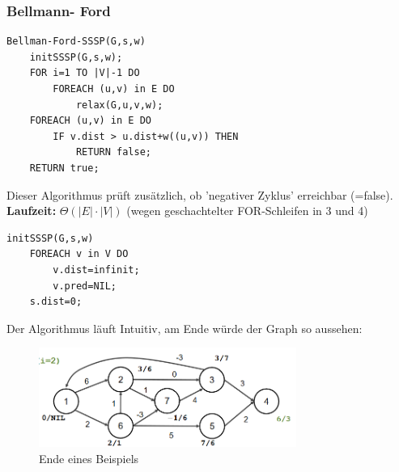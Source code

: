 \documentclass{article}
\begin{document}
            \subsubsection{Bellmann- Ford}
                \begin{lstlisting}[style=pseudocode]
Bellman-Ford-SSSP(G,s,w)
    initSSSP(G,s,w);
    FOR i=1 TO |V|-1 DO
        FOREACH (u,v) in E DO
            relax(G,u,v,w);
    FOREACH (u,v) in E DO
        IF v.dist > u.dist+w((u,v)) THEN
            RETURN false;
    RETURN true;
                \end{lstlisting}
                Dieser Algorithmus prüft zusätzlich, ob 'negativer Zyklus' erreichbar (=false).\\
                \textbf{Laufzeit:} $\Theta (|E|\cdot|V|)$ (wegen geschachtelter FOR-Schleifen in 3 und 4)\\
                \begin{lstlisting}[style=pseudocode]
initSSSP(G,s,w)
    FOREACH v in V DO
        v.dist=infinit;
        v.pred=NIL;
    s.dist=0;
                \end{lstlisting}
                Der Algorithmus läuft Intuitiv, am Ende würde der Graph so aussehen:
                \begin{figure}[ht]
                    \centering
                    \includegraphics[width=0.75\textwidth]{Bilder/BFBsp.png}
                    \caption{Ende eines Beispiels}
                    \label{fig:BFBsp}
                \end{figure}
\end{document}
